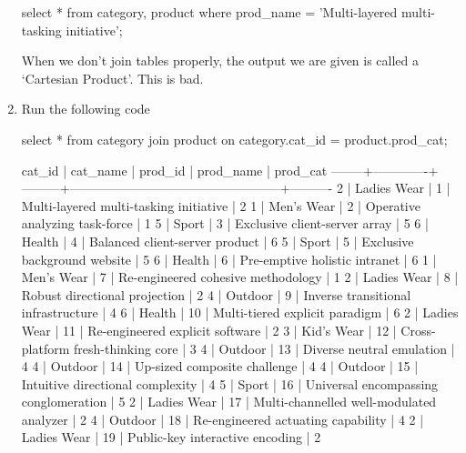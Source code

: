 \begin{enumerate}
\begin{sql}
select * from category, product where prod_name = 'Multi-layered multi-tasking initiative';
\end{sql}
When we don't join tables properly, the output we are given is called a `Cartesian Product'. This is bad.
\item Run the following code
\begin{sql}
select * from category
join product on category.cat_id = product.prod_cat;
\end{sql}
\begin{pseudo*}
 cat_id |  cat_name   | prod_id |                    prod_name                     | prod_cat   
--------+-------------+---------+--------------------------------------------------+----------  
      2 | Ladies Wear |       1 | Multi-layered multi-tasking initiative           |        2   
      1 | Men's Wear  |       2 | Operative analyzing task-force                   |        1   
      5 | Sport       |       3 | Exclusive client-server array                    |        5
      6 | Health      |       4 | Balanced client-server product                   |        6   
      5 | Sport       |       5 | Exclusive background website                     |        5   
      6 | Health      |       6 | Pre-emptive holistic intranet                    |        6   
      1 | Men's Wear  |       7 | Re-engineered cohesive methodology               |        1   
      2 | Ladies Wear |       8 | Robust directional projection                    |        2   
      4 | Outdoor     |       9 | Inverse transitional infrastructure              |        4   
      6 | Health      |      10 | Multi-tiered explicit paradigm                   |        6   
      2 | Ladies Wear |      11 | Re-engineered explicit software                  |        2   
      3 | Kid's Wear  |      12 | Cross-platform fresh-thinking core               |        3   
      4 | Outdoor     |      13 | Diverse neutral emulation                        |        4   
      4 | Outdoor     |      14 | Up-sized composite challenge                     |        4   
      4 | Outdoor     |      15 | Intuitive directional complexity                 |        4   
      5 | Sport       |      16 | Universal encompassing conglomeration            |        5   
      2 | Ladies Wear |      17 | Multi-channelled well-modulated analyzer         |        2   
      4 | Outdoor     |      18 | Re-engineered actuating capability               |        4   
      2 | Ladies Wear |      19 | Public-key interactive encoding                  |        2   

\end{pseudo*}
\end{enumerate}
